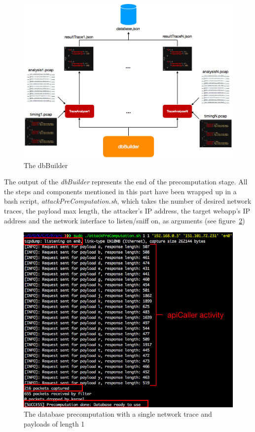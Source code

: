 \documentclass[runningheads]{llncs}
\begin{document}
\begin{figure}[h]
\centering
\includegraphics[width=\textwidth]{images/dbBuilder.png}
\caption{The dbBuilder}
\label{fig:dbBuilder}
\end{figure}

The output of the \emph{dbBuilder} represents the end of the precomputation stage. All the steps and components mentioned in this part have been wrapped up in a bash script, \emph{attackPreComputation.sh}, which takes the number of desired network traces, the payload max length, the attacker's IP address, the target webapp's IP address and the network interface to listen/sniff on, as arguments (see figure~\ref{fig:dbBuilding})

\begin{figure}[h]
\centering
\includegraphics[width=\textwidth]{images/dbBuilding.png}
\caption{The database precomputation with a single network trace and payloads of length 1}
\label{fig:dbBuilding}
\end{figure}
\end{document}
